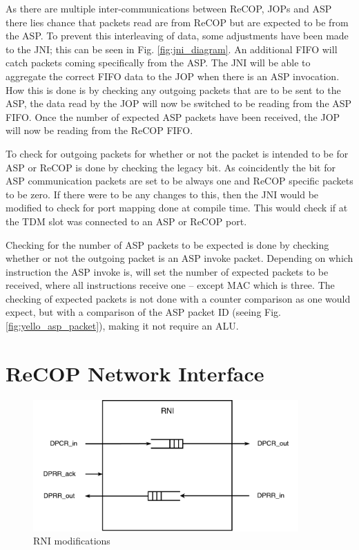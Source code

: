 \documentclass[]{article}
\begin{document}
	
	As there are multiple inter-communications between ReCOP, JOPs and ASP there lies chance that packets read are from ReCOP but are expected to be from the ASP. To prevent this interleaving of data, some adjustments have been made to the JNI; this can be seen in Fig. \ref{fig:jni_diagram}. An additional FIFO will catch packets coming specifically from the ASP. The JNI will be able to aggregate the correct FIFO data to the JOP when there is an ASP invocation. How this is done is by checking any outgoing packets that are to be sent to the ASP, the data read by the JOP will now be switched to be reading from the ASP FIFO. Once the number of expected ASP packets have been received, the JOP will now be reading from the ReCOP FIFO.
	\par
	To check for outgoing packets for whether or not the packet is intended to be for ASP or ReCOP is done by checking the legacy bit. As coincidently the bit for ASP communication packets are set to be always one and ReCOP specific packets to be zero. If there were to be any changes to this, then the JNI would be modified to check for port mapping done at compile time. This would check if at the TDM slot was connected to an ASP or ReCOP port.
	\par
	Checking for the number of ASP packets to be expected is done by checking whether or not the outgoing packet is an ASP invoke packet. Depending on which instruction the ASP invoke is, will set the number of expected packets to be received, where all instructions receive one -- except MAC which is three. The checking of expected packets is not done with a counter comparison as one would expect, but with a comparison of the ASP packet ID (seeing Fig. \ref{fig:yello_asp_packet}), making it not require an ALU.
	
	
	\section{ReCOP Network Interface}
	\begin{figure}[H]
		\centering
		\includegraphics[width = 4in]{rni_diagram}
		\caption{RNI modifications}
		\label{fig:rni_diagram}
	\end{figure}
	
\end{document}
